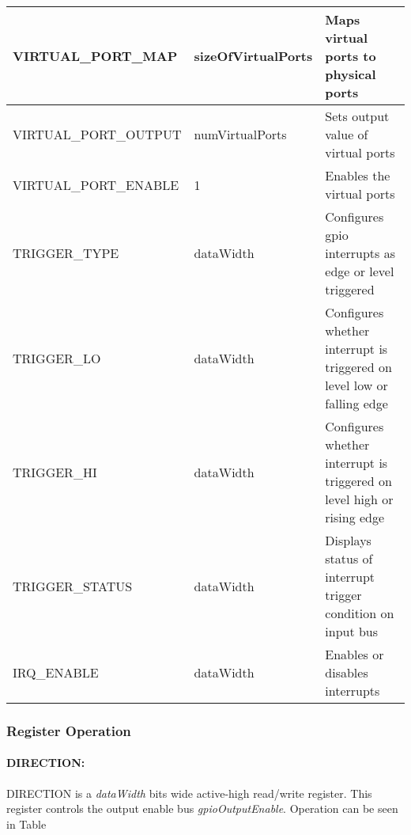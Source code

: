 \begin{longtable}[H]{
  | p{}
  | p{}
  | p{} |
  }
  VIRTUAL\_PORT\_MAP &   
  sizeOfVirtualPorts &   
  Maps virtual ports to physical ports \\ \hline

  VIRTUAL\_PORT\_OUTPUT &   
  numVirtualPorts &   
  Sets output value of virtual ports \\ \hline

  VIRTUAL\_PORT\_ENABLE &   
  1 &   
  Enables the virtual ports \\ \hline

  TRIGGER\_TYPE &   
  dataWidth &   
  Configures gpio interrupts as edge or level triggered \\ \hline
  
  TRIGGER\_LO &   
  dataWidth &   
  Configures whether interrupt is triggered on level low or falling edge \\ \hline
  
  TRIGGER\_HI &   
  dataWidth &   
  Configures whether interrupt is triggered on level high or rising edge \\ \hline
  
  TRIGGER\_STATUS &   
  dataWidth &   
  Displays status of interrupt trigger condition on input bus \\ \hline
  
  IRQ\_ENABLE &   
  dataWidth &   
  Enables or disables interrupts \\ \hline

\end{longtable}
\captionsetup{aboveskip=0pt}
\label{table:register}

  \newpage

  \subsubsection{Register Operation}
  \paragraph{DIRECTION:}
  DIRECTION is a \textit{dataWidth} bits wide active-high read/write register. This register controls the 
  output enable bus \textit{gpioOutputEnable}. Operation can be seen in Table

